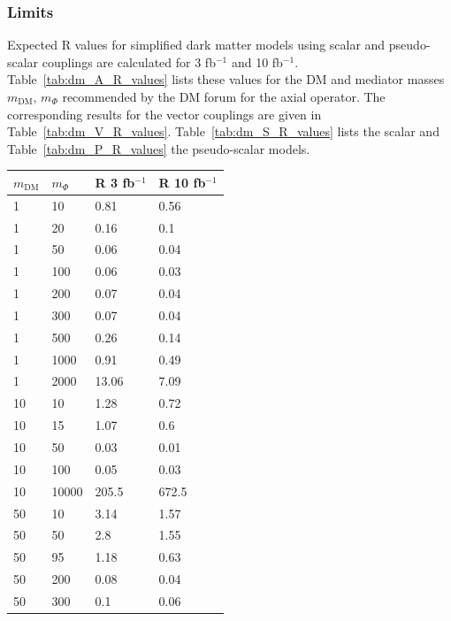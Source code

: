 \subsubsection{Limits}
Expected R values for simplified dark matter models using scalar and pseudo-scalar couplings are calculated for 3 fb$^{-1 }$ and 10 fb$^{-1 }$. Table~\ref{tab:dm_A_R_values} lists these
values for the DM and mediator masses $m_\textrm{DM}$, $m_\Phi$ recommended by the DM forum for the axial operator. The corresponding results for the vector couplings are given in Table~\ref{tab:dm_V_R_values}. Table~\ref{tab:dm_S_R_values} lists the scalar and Table~\ref{tab:dm_P_R_values} the pseudo-scalar models.



\begin{table}[h]
\centering
\begin{tabular}{llll}
\hline                      
 $m_\textrm{DM}$ & $m_\Phi$  & R 3 fb$^{-1}$ & R 10 fb$^{-1}$ \\ \hline
1       & 10      & 0.81    & 0.56 \\ \hline
1       & 20      & 0.16    & 0.1 \\ \hline
1       & 50      & 0.06    & 0.04 \\ \hline
1       & 100     & 0.06    & 0.03 \\ \hline
1       & 200     & 0.07    & 0.04 \\ \hline
1       & 300     & 0.07    & 0.04 \\ \hline
1       & 500     & 0.26    & 0.14 \\ \hline
1       & 1000    & 0.91    & 0.49 \\ \hline
1       & 2000    & 13.06   & 7.09 \\ \hline
10      & 10      & 1.28    & 0.72 \\ \hline
10      & 15      & 1.07    & 0.6 \\ \hline
10      & 50      & 0.03    & 0.01 \\ \hline
10      & 100     & 0.05    & 0.03 \\ \hline
10      & 10000   & 205.5   & 672.5 \\ \hline
50      & 10      & 3.14    & 1.57 \\ \hline
50      & 50      & 2.8     & 1.55 \\ \hline
50      & 95      & 1.18    & 0.63 \\ \hline
50      & 200     & 0.08    & 0.04 \\ \hline
50      & 300     & 0.1     & 0.06 \\ \hline

\end{tabular}
\end{table}
